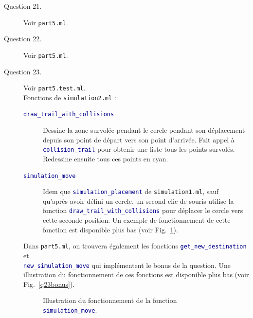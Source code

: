\documentclass[11pt]{scrartcl}
\newcommand{\funname}[1]{\texttt{\textcolor{darkblue}{#1}}}
\newcommand{\filename}[1]{\texttt{\textcolor{darkbrown}{#1}}}
\begin{document}
\begin{description}
\item[Question 21.] Voir \filename{part5.ml}.

\item[Question 22.] Voir \filename{part5.ml}.

\item[Question 23.] Voir \filename{part5.test.ml}.\\
Fonctions de \filename{simulation2.ml} :
\begin{description}
\item[\funname{draw_trail_with_collisions}] Dessine la zone survolée pendant le cercle pendant son déplacement depuis son point de départ vers son point d'arrivée. Fait appel à \funname{collision_trail} pour obtenir une liste tous les points survolés. Redessine ensuite tous ces points en cyan.
\item[\funname{simulation_move}] Idem que \funname{simulation_placement} de \filename{simulation1.ml}, sauf \\ qu'après avoir défini un cercle, un second clic de souris utilise la fonction \funname{draw_trail_with_collisions} pour déplacer le cercle vers cette seconde position. Un exemple de fonctionnement de cette fonction est disponible plus bas (voir Fig.~\ref{q23}).
\end{description}
Dans \filename{part5.ml}, on trouvera également les fonctions \funname{get_new_destination} et \\ \funname{new_simulation_move} qui implémentent le bonus de la question. Une illustration du fonctionnement de ces fonctions est disponible plus bas (voir Fig.~\ref{q23bonus}).

\begin{figure}[h]
	\centering
	\caption{\label{q23} Illustration du fonctionnement de la fonction \funname{simulation_move}.}
\end{figure}


\end{description}
\end{document}

